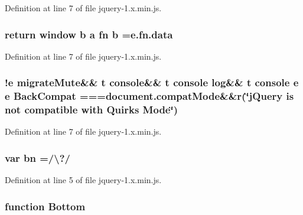 Definition at line 7 of file jquery-\/1.\+x.\+min.\+js.

\subsubsection[{\texorpdfstring{b}{b}}]{\setlength{\rightskip}{0pt plus 5cm}return {\bf window} b {\bf a} {\bf fn} b ={\bf e.\+fn.\+data}}\hypertarget{jquery-1_8x_8min_8js_a14e11a60aa3603727bb80abf8f71a4d5}{}\label{jquery-1_8x_8min_8js_a14e11a60aa3603727bb80abf8f71a4d5}


Definition at line 7 of file jquery-\/1.\+x.\+min.\+js.

\subsubsection[{\texorpdfstring{Back\+Compat}{BackCompat}}]{ !{\bf e} migrate\+Mute\&\& {\bf t} console\&\& {\bf t} console {\bf log}\&\& {\bf t} console {\bf e} {\bf e} Back\+Compat ===document.\+compat\+Mode\&\&r(\char`\"{}j\+Query is not compatible with Quirks Mode\char`\"{})}\hypertarget{jquery-1_8x_8min_8js_a0ecb6dcd5691453c7b253ea60ad28e9b}{}\label{jquery-1_8x_8min_8js_a0ecb6dcd5691453c7b253ea60ad28e9b}


Definition at line 7 of file jquery-\/1.\+x.\+min.\+js.

\subsubsection[{\texorpdfstring{bn}{bn}}]{\setlength{\rightskip}{0pt plus 5cm}var bn =/\textbackslash{}?/}\hypertarget{jquery-1_8x_8min_8js_ac1a6899002e156376de301d5f5fa36d8}{}\label{jquery-1_8x_8min_8js_ac1a6899002e156376de301d5f5fa36d8}


Definition at line 5 of file jquery-\/1.\+x.\+min.\+js.

\subsubsection[{\texorpdfstring{Bottom}{Bottom}}]{\setlength{\rightskip}{0pt plus 5cm}function Bottom}\hypertarget{jquery-1_8x_8min_8js_aff76c1cba4a00c678dfce0e0c5a5538a}{}\label{jquery-1_8x_8min_8js_aff76c1cba4a00c678dfce0e0c5a5538a}


